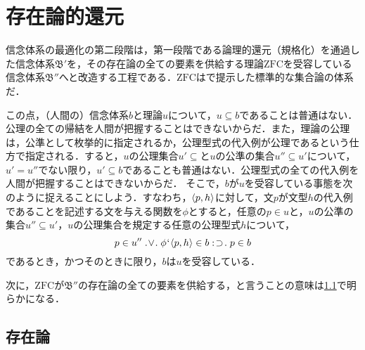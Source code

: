 
\section{存在論的還元}
\label{sec:存在論的還元}

信念体系の最適化の第二段階は，第一段階である論理的還元（規格化）を通過した信念体系$\mathfrak{B}'$を，その存在論の全ての要素を供給する理論$\mathrm{ZFC}$を受容している信念体系$\mathfrak{B}''$へと改造する工程である．$\mathrm{ZFC}$はで提示した標準的な集合論の体系だ．

この点，（人間の）信念体系$b$と理論$u$について，$u\subseteq b$であることは普通はない．公理の全ての帰結を人間が把握することはできないからだ．また，理論の公理は，公準として枚挙的に指定されるか，公理型式の代入例が公理であるという仕方で指定される．すると，$u$の公理集合$u'\subseteq$と$u$の公準の集合$u''\subseteq u'$について，$u' = u''$でない限り，$u'\subseteq b$であることも普通はない．公理型式の全ての代入例を人間が把握することはできないからだ．
そこで，$b$が$u$を受容している事態を次のように捉えることにしよう．すなわち，$ \langle p,h \rangle $に対して，文$p$が文型$h$の代入例であることを記述する文を与える関数を$\phi$とすると，任意の$p\in u$と，$u$の公準の集合$ u''\subseteq u'$，$u$の公理集合を規定する任意の公理型式$h$について，
\[
    p\in u''\case{2}{1}{1}\phi\fap\orp{p,h}\in b\case{1}{2}{1}p\in b
\]
であるとき，かつそのときに限り，$b$は$u$を受容している．

次に，$\mathrm{ZFC}$が$\mathfrak{B}''$の存在論の全ての要素を供給する，と言うことの意味は\ref{ssec:存在論}で明らかになる．

\subsection{存在論}
\label{ssec:存在論}

